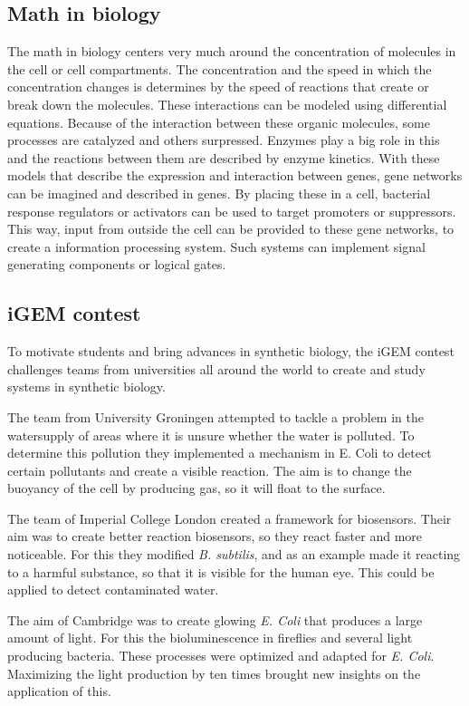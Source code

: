 \documentclass[a4paper]{article}
\begin{document}
\subsection{Math in biology}
The math in biology centers very much around the concentration of molecules in the cell or cell compartments. The concentration and the speed in which the concentration changes is determines by the speed of reactions that create or break down the molecules. These interactions can be modeled using differential equations. Because of the interaction between these organic molecules, some processes are catalyzed and others surpressed. Enzymes play a big role in this and the reactions between them are described by enzyme kinetics. With these models that describe the expression and interaction between genes, gene networks can be imagined and described in genes. By placing these in a cell, bacterial response regulators or activators can be used to target promoters or suppressors. This way, input from outside the cell can be provided to these gene networks, to create a information processing system. Such systems can implement signal generating components or logical gates.

\subsection{iGEM contest}

To motivate students and bring advances in synthetic biology, the iGEM contest challenges teams from universities all around the world to create and study systems in synthetic biology.

The team from University Groningen attempted to tackle a problem in the watersupply of areas where it is unsure whether the water is polluted. To determine this pollution they implemented a mechanism in E. Coli to detect certain pollutants and create a visible reaction. The aim is to change the buoyancy of the cell by producing gas, so it will float to the surface.

The team of Imperial College London created a framework for biosensors. Their aim was to create better reaction biosensors, so they react faster and more noticeable. For this they modified \textit{B. subtilis}, and as an example made it reacting to a harmful substance, so that it is visible for the human eye. This could be applied to detect contaminated water.

The aim of Cambridge was to create glowing \textit{E. Coli} that produces a large amount of light. For this the bioluminescence in fireflies and several light producing bacteria. These processes were optimized and adapted for \textit{E. Coli}. Maximizing the light production by ten times brought new insights on the application of this.
\end{document}

